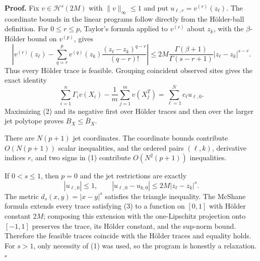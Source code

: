 \textbf{Proof.}
Fix \(v\in\mathcal H^s(2M)\) with \(\|v\|_\infty\le1\) and put \(u_{\ell,r}=v^{(r)}(z_\ell)\). The coordinate bounds in the linear programs follow directly from the H\"older-ball definition. For \(0\le r\le p\), Taylor's formula applied to \(v^{(r)}\) about \(z_k\), with the \(\beta\)-H\"older bound on \(v^{(p)}\), gives
\[
\left|v^{(r)}(z_\ell)-\sum_{q=r}^p
v^{(q)}(z_k)\frac{(z_\ell-z_k)^{q-r}}{(q-r)!}\right|
\le
2M\frac{\Gamma(\beta+1)}{\Gamma(s-r+1)}|z_\ell-z_k|^{s-r}.
\tag{1}
\]
Thus every H\"older trace is feasible. Grouping coincident observed sites gives the exact identity
\[
\sum_{i=1}^n\Gamma_i v(X_i)-\frac1m\sum_{j=1}^mv(X_j^T)
=\sum_{\ell=1}^Nc_\ell u_{\ell,0}.
\tag{2}
\]
Maximizing (2) and its negative first over H\"older traces and then over the larger jet polytope proves \(B_X\le\overline B_X\).

There are \(N(p+1)\) jet coordinates. The coordinate bounds contribute \(O(N(p+1))\) scalar inequalities, and the ordered pairs \((\ell,k)\), derivative indices \(r\), and two signs in (1) contribute \(O(N^2(p+1))\) inequalities.

If \(0<s\le1\), then \(p=0\) and the jet restrictions are exactly
\[
|u_{\ell,0}|\le1,
\qquad
|u_{\ell,0}-u_{k,0}|\le2M|z_\ell-z_k|^s.
\tag{3}
\]
The metric \(d_s(x,y)=|x-y|^s\) satisfies the triangle inequality. The McShane formula extends every trace satisfying (3) to a function on \([0,1]\) with H\"older constant \(2M\); composing this extension with the one-Lipschitz projection onto \([-1,1]\) preserves the trace, its H\"older constant, and the sup-norm bound. Therefore the feasible traces coincide with the H\"older traces and equality holds. For \(s>1\), only necessity of (1) was used, so the program is honestly a relaxation. \(\square\)